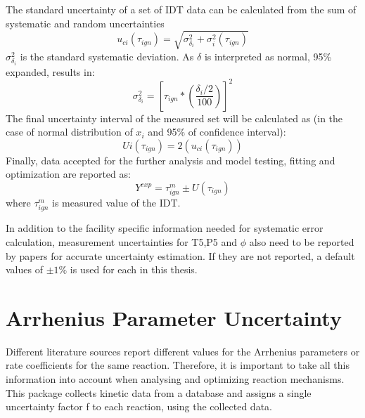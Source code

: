 The standard uncertainty of a set of IDT data can be calculated from the sum of systematic and random uncertainties
\begin{equation}
	u_{ci}(\tau_{ign}) = \sqrt{\sigma_{\delta_i}^2 + \sigma_i^2(\tau_{ign})}
\end{equation}
$\sigma_{\delta_i}^2$ is the standard systematic deviation. As $\delta$ is interpreted as normal, 95\% expanded, results in:
\begin{equation}
	\sigma_{\delta_i}^2 = \left[ \tau_{ign} * \left( \frac{\delta_i/2}{100} \right) \right]^2
\end{equation}
The final uncertainty interval of the measured set will be calculated as (in the case of normal distribution of $x_i$ and 95\% of confidence interval):
\begin{equation}
	Ui(\tau_{ign}) = 2(u_{ci}(\tau_{ign}))
\end{equation}
Finally, data accepted for the further analysis and model testing, fitting and optimization are reported as:
\begin{equation}
	Y^{exp} = \tau_{ign}^m \pm U(\tau_{ign})
\end{equation}
where $\tau_{ign}^m$ is measured value of the IDT.

In addition to the facility specific information needed for systematic error calculation, measurement uncertainties for T5,P5 and $\phi$ also need to be reported by papers for accurate uncertainty estimation. If they are not reported, a default values of $\pm 1\%$ is used for each in this thesis. 

\section{Arrhenius Parameter Uncertainty}
Different literature sources report different values for the Arrhenius parameters or rate coefficients for the same reaction. Therefore, it is important to take all this information into account when analysing and optimizing reaction mechanisms. This package collects kinetic data from a database and assigns a single uncertainty factor f to each reaction, using the collected data.  



